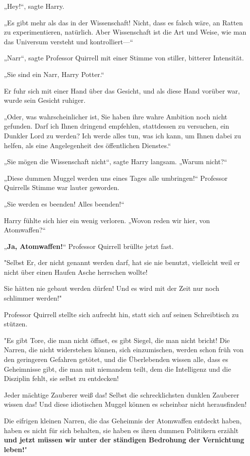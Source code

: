 {„Hey!“, sagte Harry.

„Es gibt mehr als das in der Wissenschaft! Nicht, dass es falsch wäre, an Ratten zu experimentieren, natürlich. Aber Wissenschaft ist die Art und Weise, wie man das Universum versteht und kontrolliert—“

„Narr“, sagte Professor Quirrell mit einer Stimme von stiller, bitterer Intensität.

„Sie sind ein Narr, Harry Potter.“

Er fuhr sich mit einer Hand über das Gesicht, und als diese Hand vorüber war, wurde sein Gesicht ruhiger.

„Oder, was wahrscheinlicher ist, Sie haben ihre wahre Ambition noch nicht gefunden. Darf ich Ihnen dringend empfehlen, stattdessen zu versuchen, ein Dunkler Lord zu werden? Ich werde alles tun, was ich kann, um Ihnen dabei zu helfen, als eine Angelegenheit des öffentlichen Dienstes.“

„Sie mögen die Wissenschaft nicht“, sagte Harry langsam. „Warum nicht?“

„Diese dummen Muggel werden uns eines Tages alle umbringen!“ Professor Quirrells Stimme war lauter geworden.

„Sie werden es beenden! Alles beenden!“

Harry fühlte sich hier ein wenig verloren. „Wovon reden wir hier, von Atomwaffen?“

„\textbf{Ja, Atomwaffen!}“ Professor Quirrell brüllte jetzt fast.

"Selbst Er, der nicht genannt werden darf, hat sie nie benutzt, vielleicht weil er nicht über einen Haufen Asche herrschen wollte!

Sie hätten nie gebaut werden dürfen! Und es wird mit der Zeit nur noch schlimmer werden!"

Professor Quirrell stellte sich aufrecht hin, statt sich auf seinen Schreibtisch zu stützen.

"Es gibt Tore, die man nicht öffnet, es gibt Siegel, die man nicht bricht! Die Narren, die nicht widerstehen können, sich einzumischen, werden schon früh von den geringeren Gefahren getötet, und die Überlebenden wissen alle, dass es Geheimnisse gibt, die man mit niemandem teilt, dem die Intelligenz und die Disziplin fehlt, sie selbst zu entdecken!

Jeder mächtige Zauberer weiß das! Selbst die schrecklichsten dunklen Zauberer wissen das! Und diese idiotischen Muggel können es scheinbar nicht herausfinden!

Die eifrigen kleinen Narren, die das Geheimnis der Atomwaffen entdeckt haben, haben es nicht für sich behalten, sie haben es ihren dummen Politikern erzählt \textbf{und jetzt müssen wir unter der ständigen Bedrohung der Vernichtung leben!}"

}
